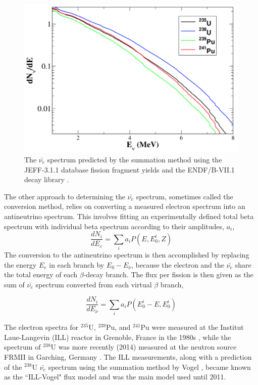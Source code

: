 \begin{figure}[t]
	\centering
	\includegraphics[width=0.65\linewidth]{tex/3-reactorneutrinos-images/Spectrum}
	\caption[The $\bar{\nu_e}$ spectrum.]{The $\bar{\nu_e}$ spectrum predicted by the summation method using the JEFF-3.1.1 database fission fragment yields and the ENDF/B-VII.1 decay library \cite{HayesVogel}.}
	\label{fig:spectrum}
\end{figure}

The other approach to determining the $\bar{\nu_{e}}$ spectrum, sometimes called the conversion method, relies on converting a measured electron spectrum into an antineutrino spectrum. 
This involves fitting an experimentally defined total beta spectrum with individual beta spectrum  according to their amplitudes, $a_i$, 
\begin{equation}
	\frac{dN_i}{dE_e} = \sum_{i}a_iP(E,E^i_0,Z)
\end{equation}
The conversion to the antineutrino spectrum is then accomplished by replacing the energy $E_e$ in each branch by $E_0 - E_{\bar{\nu}}$, because the electron and the $\bar{\nu_e}$ share the total energy of each $\beta$-decay branch.
The flux per fission is then given as the sum of $\bar{\nu_e}$ spectrum converted from each virtual $\beta$ branch,

\begin{equation}
	\frac{dN_i}{dE_{\bar{\nu}}} = \sum_{i}a_iP(E^i_0-E,E^i_0)
\end{equation}


The electron spectra for $^{235}$U, $^{239}$Pu, and $^{241}$Pu were measured at the Institut
Laue-Langevin (ILL) reactor in Grenoble, France in the 1980s \cite{VonFeilitzsch:1982jw,Schreckenbach:1985ep,Hahn:1989zr}, while the spectrum of $^{238}$U was more recently (2014) measured at the neutron source FRMII in Garching, Germany \cite{Haag:2013raa}.
The ILL measurements, along with a prediction of the $^{238}$U $\bar{\nu_{e}}$ spectrum using the summation method by Vogel \cite{PhysRevC.24.1543}, became known as the ``ILL-Vogel" flux model and was the main model used until 2011.


